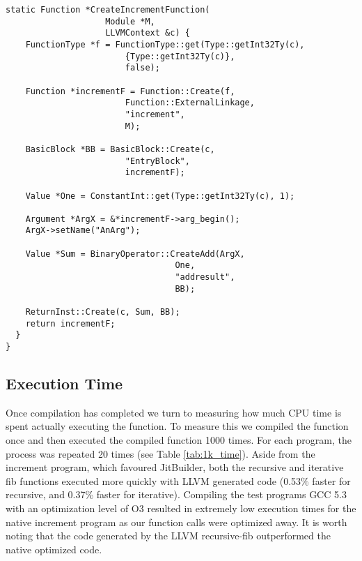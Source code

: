 \begin{lstlisting}[float,floatplacement=H,
  caption={Generating MCJIT IR for the increment program.},
  label=lst:llvm_increment]
  static Function *CreateIncrementFunction(
                    Module *M, 
                    LLVMContext &c) {
    FunctionType *f = FunctionType::get(Type::getInt32Ty(c), 
                        {Type::getInt32Ty(c)}, 
                        false);
    
    Function *incrementF = Function::Create(f, 
                        Function::ExternalLinkage, 
                        "increment", 
                        M);

    BasicBlock *BB = BasicBlock::Create(c, 
                        "EntryBlock", 
                        incrementF);
    
    Value *One = ConstantInt::get(Type::getInt32Ty(c), 1);
    
    Argument *ArgX = &*incrementF->arg_begin(); 
    ArgX->setName("AnArg");
  
    Value *Sum = BinaryOperator::CreateAdd(ArgX, 
                                  One,
                                  "addresult", 
                                  BB);
  
    ReturnInst::Create(c, Sum, BB);
    return incrementF;
  }
}\end{lstlisting}

\subsection{Execution Time}
Once compilation has completed we turn to measuring how much CPU time is spent actually executing the function.
To measure this we compiled the function once and then executed the compiled function 1000 times.
For each program, the process was repeated 20 times (see Table \ref{tab:1k_time}).
Aside from the increment program, which favoured JitBuilder, both the recursive and iterative fib functions executed more quickly with LLVM generated code (0.53\% faster for recursive, and 0.37\% faster for iterative).
Compiling the test programs GCC 5.3 with an optimization level of O3 resulted in extremely low execution times for the native increment program as our function calls were optimized away.
It is worth noting that the code generated by the LLVM recursive-fib outperformed the native optimized code.


